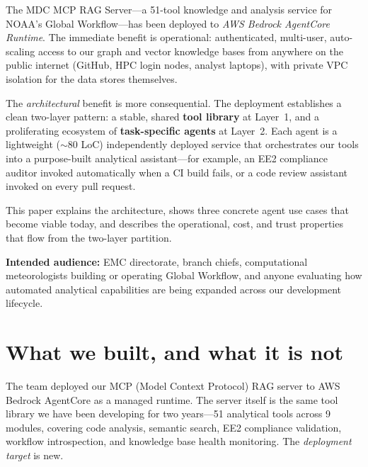 \documentclass[11pt,letterpaper]{article}
\begin{document}
\begin{mdframed}[linecolor=noaablue, linewidth=0.8pt, backgroundcolor=paper,
                  leftmargin=0pt, rightmargin=0pt, innertopmargin=10pt,
                  innerbottommargin=10pt, innerleftmargin=12pt,
                  innerrightmargin=12pt, roundcorner=3pt]
The MDC MCP RAG Server---a 51-tool knowledge and analysis service for NOAA's
Global Workflow---has been deployed to \emph{AWS Bedrock AgentCore Runtime}.
The immediate benefit is operational: authenticated, multi-user, auto-scaling
access to our graph and vector knowledge bases from anywhere on the public
internet (GitHub, HPC login nodes, analyst laptops), with private VPC
isolation for the data stores themselves.

The \emph{architectural} benefit is more consequential. The deployment
establishes a clean two-layer pattern: a stable, shared \textbf{tool library}
at Layer~1, and a proliferating ecosystem of \textbf{task-specific agents}
at Layer~2. Each agent is a lightweight ($\sim$80 LoC) independently deployed
service that orchestrates our tools into a purpose-built analytical
assistant---for example, an EE2 compliance auditor invoked automatically
when a CI build fails, or a code review assistant invoked on every pull
request.

This paper explains the architecture, shows three concrete agent use cases
that become viable today, and describes the operational, cost, and trust
properties that flow from the two-layer partition.
\end{mdframed}

\vspace{6pt}

\noindent\textbf{Intended audience:} EMC directorate, branch chiefs,
computational meteorologists building or operating Global Workflow, and
anyone evaluating how automated analytical capabilities are being expanded
across our development lifecycle.

\vspace{0.3in}
\tableofcontents
\newpage

\section{What we built, and what it is not}

The team deployed our MCP (Model Context Protocol) RAG server to AWS Bedrock
AgentCore as a managed runtime. The server itself is the same tool library
we have been developing for two years---51 analytical tools across 9
modules, covering code analysis, semantic search, EE2 compliance validation,
workflow introspection, and knowledge base health monitoring. The
\emph{deployment target} is new.
\end{document}
